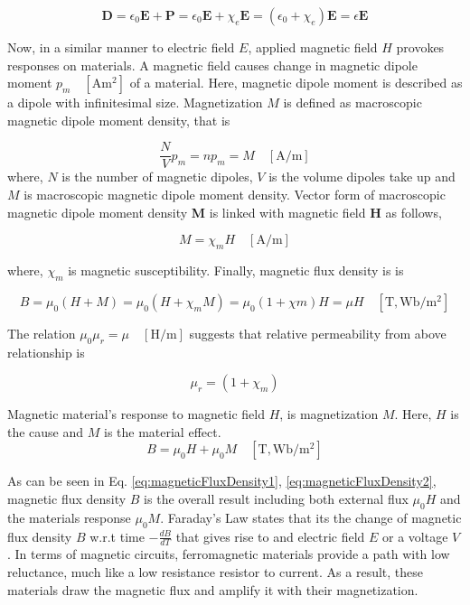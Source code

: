 \begin{equation}
	\mathbf{D} = \epsilon_{0} \mathbf{E} + \mathbf{P} = \epsilon_{0} \mathbf{E} + \chi_{e} \mathbf{E} =(\epsilon_{0} + \chi_{e}) \mathbf{E} = \epsilon \mathbf{E}
\end{equation}

Now, in a similar manner to electric field $E$, applied magnetic field $H$ provokes responses on materials. A magnetic field causes change in magnetic dipole moment $p_{m} \quad [\mathrm{Am^{2}}]$ of a material. Here, magnetic dipole moment is described as a dipole with infinitesimal size. Magnetization $M$ is defined as macroscopic magnetic dipole moment density, that is 

\begin{equation}
	\frac{N}{V} p_{m} = np_{m} = M \quad [\mathrm{A/m}]
\end{equation}
where, $N$ is the number of magnetic dipoles, $V$ is the volume dipoles take up and $M$ is macroscopic magnetic dipole moment density. Vector form of macroscopic magnetic dipole moment density \textbf{M} is linked with magnetic field \textbf{H} as follows, 

\begin{equation}
	M = \chi_{m} H \quad [\mathrm{A/m}]
\end{equation}

where, $\chi_{m}$ is magnetic susceptibility. Finally, magnetic flux density is is

\begin{equation}
	B = \mu_{0} (H + M) = \mu_{0} (H + \chi_{m} M) =\mu_{0} (1 + \chi{m}) H = \mu H \quad [\mathrm{T}, \mathrm{Wb/m^{2}}]
	\label{eq:magneticFluxDensity1}
\end{equation}

The relation $\mu_{0} \mu_{r} = \mu \quad [\mathrm{H/m}]$ suggests that relative permeability from above relationship is

\begin{equation}
	\mu_{r} = (1 + \chi_{m})
\end{equation}

Magnetic material's response to magnetic field $H$, is magnetization $M$. Here, $H$ is the cause and $M$ is the material effect.
\begin{equation}
	B = \mu_{0} H + \mu_{0} M \quad [\mathrm{T}, \mathrm{Wb/m^{2}}]
	\label{eq:magneticFluxDensity2}
\end{equation}

As can be seen in Eq. \ref{eq:magneticFluxDensity1}, \ref{eq:magneticFluxDensity2}, magnetic flux density $B$ is the overall result including both external flux $\mu_{0} H$ and the materials response $\mu_{0} M$. Faraday's Law states that its the change of magnetic flux density $B$ w.r.t time $-\frac{dB}{dT}$ that gives rise to and electric field $E$ or a voltage $V$. In terms of magnetic circuits, ferromagnetic materials provide a path with low reluctance, much like a low resistance resistor to current. As a result, these materials draw the magnetic flux and amplify it with their magnetization.

